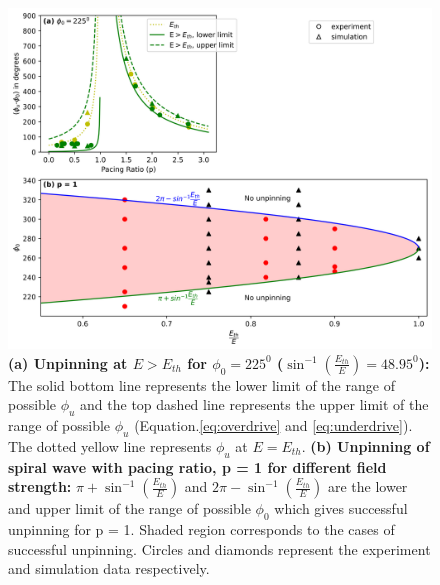 \begin{figure}[htb!]
    \centering
    \includegraphics[scale=0.7]{E.png}
    \caption{\textbf{(a) Unpinning at $E>E_{th}$ for ${\phi}_0 = 225^0$
	(${\sin^{-1}}{(\frac{E_{th}}{E})}=48.95^0$):} The solid bottom line
	represents the lower limit of the range of possible ${\phi}_u$ and the
	top dashed line represents the upper limit of the range of possible
	${\phi}_u$ (Equation.\ref{eq:overdrive} and \ref{eq:underdrive}). The
	dotted yellow line represents ${\phi}_u$ at $E=E_{th}$.  \textbf{(b)
	Unpinning of spiral wave with pacing ratio, p = 1 for different field
	strength:} $\pi+{\sin^{-1}}{(\frac{E_{th}}{E})}$ and
	$2\pi-{\sin^{-1}}{(\frac{E_{th}}{E})}$ are the lower and upper limit of
	the range of possible ${\phi}_0$ which gives successful unpinning for p
	= 1. Shaded region corresponds to the cases of successful unpinning.
    Circles and diamonds represent the experiment and simulation data
	respectively.} \label{fig:E_p1}
\end{figure}

